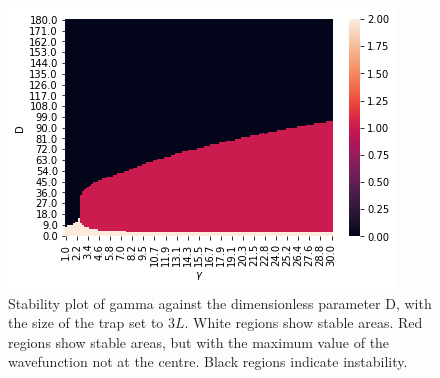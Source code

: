 \documentclass[10pt]{article}
\numberwithin{equation}{section}
\begin{document}
\begin{multicols}{2}
\begin{figure}[H]
\centering
\includegraphics[width=\linewidth]{high definition box stability plot}
\caption{Stability plot of gamma against the dimensionless parameter D, with the size of the trap set to $3L$. White regions show stable areas. Red regions show stable areas, but with the maximum value of the wavefunction not at the centre. Black regions indicate instability.}
\end{figure}


\end{multicols}
\end{document}
